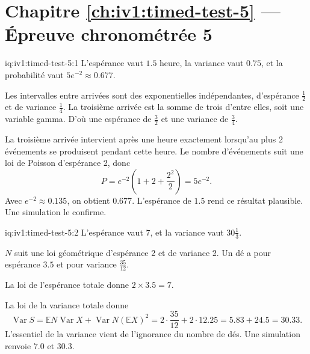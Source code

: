 \section*{Chapitre \ref{ch:iv1:timed-test-5} --- Épreuve chronométrée 5}

\enlargethispage{-2\baselineskip}%
\begin{solution}{iq:iv1:timed-test-5:1}
L'espérance vaut $1.5$ heure, la variance vaut $0.75$, et la probabilité vaut $5e^{-2} \approx 0.677$.

Les intervalles entre arrivées sont des exponentielles indépendantes, d'espérance $\frac12$ et de variance $\frac14$. La troisième arrivée est la somme de trois d'entre elles, soit une variable gamma. D'où une espérance de $\frac32$ et une variance de $\frac34$.

La troisième arrivée intervient après une heure exactement lorsqu'au plus 2 événements se produisent pendant cette heure. Le nombre d'événements suit une loi de Poisson d'espérance 2, donc
\[
P = e^{-2}\left(1 + 2 + \frac{2^2}{2}\right) = 5e^{-2}.
\]
Avec $e^{-2} \approx 0.135$, on obtient $0.677$. L'espérance de $1.5$ rend ce résultat plausible. Une simulation le confirme.

\end{solution}

\begin{solution}{iq:iv1:timed-test-5:2}
L'espérance vaut 7, et la variance vaut $30\frac13$.

$N$ suit une loi géométrique d'espérance 2 et de variance 2. Un dé a pour espérance $3.5$ et pour variance $\frac{35}{12}$.

La loi de l'espérance totale donne $2 \times 3.5 = 7$.

La loi de la variance totale donne
\[
\operatorname{Var}S = \mathbb{E}N\operatorname{Var}X + \operatorname{Var}N(\mathbb{E}X)^2 = 2 \cdot \frac{35}{12} + 2 \cdot 12.25 = 5.83 + 24.5 = 30.33.
\]
L'essentiel de la variance vient de l'ignorance du nombre de dés. Une simulation renvoie $7.0$ et $30.3$.

\end{solution}

